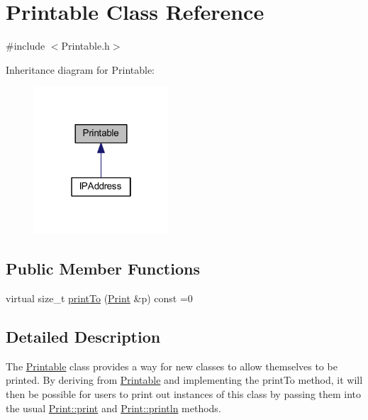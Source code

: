 \hypertarget{class_printable}{}\section{Printable Class Reference}
\label{class_printable}


{\ttfamily \#include $<$Printable.\+h$>$}



Inheritance diagram for Printable\+:\nopagebreak
\begin{figure}[H]
\begin{center}
\leavevmode
\includegraphics[width=142pt]{class_printable__inherit__graph}
\end{center}
\end{figure}
\subsection*{Public Member Functions}
\begin{DoxyCompactItemize}
\item 
virtual size\+\_\+t \hyperlink{class_printable_a95c9f86bb3e38a8743433c80c9250664}{print\+To} (\hyperlink{class_print}{Print} \&p) const  =0
\end{DoxyCompactItemize}


\subsection{Detailed Description}
The \hyperlink{class_printable}{Printable} class provides a way for new classes to allow themselves to be printed. By deriving from \hyperlink{class_printable}{Printable} and implementing the print\+To method, it will then be possible for users to print out instances of this class by passing them into the usual \hyperlink{class_print_a443a13ae44e1a8930db53fc5161554f9}{Print\+::print} and \hyperlink{class_print_a36d02f29121121bca22cd51d468dfa9e}{Print\+::println} methods. 

